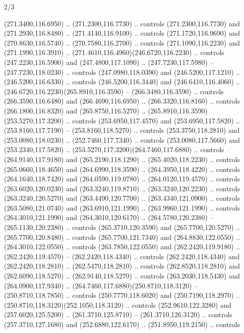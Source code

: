 \begin{flagdescription}{2/3}
\begin{scope}[xshift=0.5\flaglength,yshift=0.5\flagwidth,scale=\flagwidth/259.2]
\begin{scope}[y=0.8pt, x=0.8pt, yscale=-1,shift={(-243,-162)}]
      (271.3400,116.6950) .. (271.2300,116.7730) .. controls (271.2300,116.7730) and
      (271.2930,116.8480) .. (271.4140,116.9100) .. controls (271.1720,116.9690) and
      (270.8630,116.5740) .. (270.7580,116.2700) .. controls (271.1090,116.2230) and
      (271.1990,116.3910) .. (271.4610,116.4960)(246.6720,116.2230) .. controls
      (247.2230,116.5900) and (247.4800,117.1090) .. (247.7230,117.5980) --
      (247.7230,118.0230) .. controls (247.0980,118.0390) and (246.5200,117.1210) ..
      (246.5200,116.6330) .. controls (246.5200,116.3440) and (246.6410,116.4060) ..
      (246.6720,116.2230)(265.8910,116.3590) -- (266.3480,116.3590) .. controls
      (266.3590,116.6480) and (266.4690,116.6950) .. (266.3320,116.8160) .. controls
      (266.1800,116.8320) and (265.8750,116.5270) ..
      (265.8910,116.3590)(253.5270,117.3200) .. controls (253.6950,117.4570) and
      (253.6950,117.5820) .. (253.8160,117.7190) -- (253.8160,118.5270) .. controls
      (253.3750,118.2810) and (253.0080,118.0230) .. (252.7460,117.7340) .. controls
      (253.0080,117.5660) and (253.2340,117.5820) ..
      (253.5270,117.3200)(264.7460,117.6880) .. controls (264.9140,117.9180) and
      (265.2190,118.1290) .. (265.4020,118.2230) .. controls (265.0660,118.4650) and
      (264.6990,118.3590) .. (264.3950,118.4220) .. controls (264.1640,118.7420) and
      (264.0590,119.0780) .. (264.0120,119.4570) .. controls (263.6020,120.0230) and
      (263.3240,119.8710) .. (263.3240,120.2230) .. controls (263.3240,120.5270) and
      (263.4490,120.7700) .. (263.4340,121.0900) .. controls (263.5080,121.0740) and
      (263.6910,121.1990) .. (263.9960,121.1990) .. controls (264.3010,121.1990) and
      (264.3010,120.6170) .. (264.5780,120.2380) -- (265.1130,120.2380) .. controls
      (265.3710,120.3590) and (265.7700,120.5270) .. (265.7700,120.8480) .. controls
      (265.7700,121.7340) and (264.8830,122.0550) .. (264.3010,122.0550) .. controls
      (263.7850,122.0550) and (262.2420,119.9180) .. (262.2420,119.4570) --
      (262.2420,118.4340) .. controls (262.2420,118.4340) and (262.2420,118.2810) ..
      (262.5470,118.2810) .. controls (262.8520,118.2810) and (262.6090,118.5270) ..
      (262.9140,118.5270) .. controls (263.2030,118.5430) and (264.0900,117.9340) ..
      (264.7460,117.6880)(250.8710,118.3120) -- (250.8710,118.7850) .. controls
      (250.7770,118.6020) and (250.7190,118.2970) ..
      (250.8710,118.3120)(252.1050,118.3120) .. controls (252.9610,122.3280) and
      (257.6020,125.5200) .. (261.3710,125.8710) -- (261.3710,126.3120) .. controls
      (257.3710,127.1680) and (252.6880,122.6170) .. (251.8950,119.2150) .. controls

\end{scope}
\end{scope}
\end{flagdescription}
